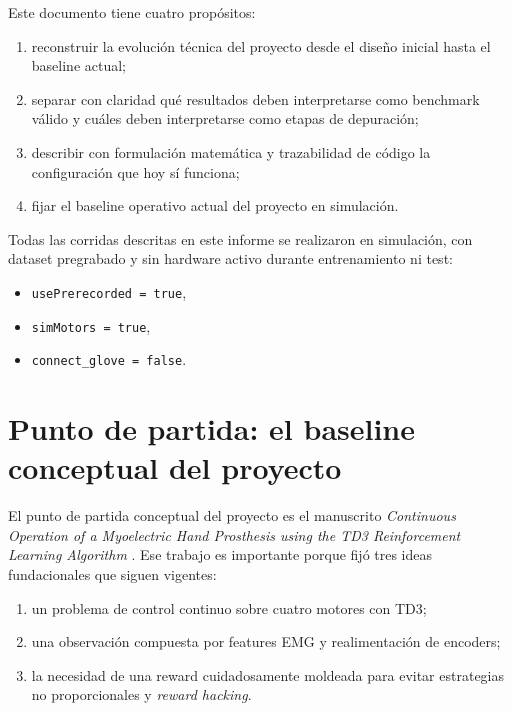 \documentclass[11pt,a4paper]{article}
\begin{document}
Este documento tiene cuatro prop\'ositos:
\begin{enumerate}[leftmargin=1.2cm]
    \item reconstruir la evoluci\'on t\'ecnica del proyecto desde el dise\~no inicial hasta el baseline actual;
    \item separar con claridad qu\'e resultados deben interpretarse como benchmark v\'alido y cu\'ales deben interpretarse como etapas de depuraci\'on;
    \item describir con formulaci\'on matem\'atica y trazabilidad de c\'odigo la configuraci\'on que hoy s\'i funciona;
    \item fijar el baseline operativo actual del proyecto en simulaci\'on.
\end{enumerate}

Todas las corridas descritas en este informe se realizaron en simulaci\'on, con dataset pregrabado y sin hardware activo durante entrenamiento ni test:
\begin{itemize}[leftmargin=1.2cm]
    \item \texttt{usePrerecorded = true},
    \item \texttt{simMotors = true},
    \item \texttt{connect\_glove = false}.
\end{itemize}

\section{Punto de partida: el baseline conceptual del proyecto}

El punto de partida conceptual del proyecto es el manuscrito \emph{Continuous Operation of a Myoelectric Hand Prosthesis using the TD3 Reinforcement Learning Algorithm} \citep{fuertes2026continuous}. Ese trabajo es importante porque fij\'o tres ideas fundacionales que siguen vigentes:
\begin{enumerate}[leftmargin=1.2cm]
    \item un problema de control continuo sobre cuatro motores con TD3;
    \item una observaci\'on compuesta por features EMG y realimentaci\'on de encoders;
    \item la necesidad de una reward cuidadosamente moldeada para evitar estrategias no proporcionales y \emph{reward hacking}.
\end{enumerate}
\end{document}
